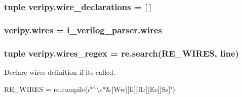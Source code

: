 \hypertarget{namespaceveripy_a1bf7781cecfa001f9a1c00ad44cb8f59}{
\subsubsection[{wire\-\_\-declarations}]{\setlength{\rightskip}{0pt plus 5cm}tuple veripy.\-wire\-\_\-declarations = \mbox{[}$\,$\mbox{]}}}\label{namespaceveripy_a1bf7781cecfa001f9a1c00ad44cb8f59}
\hypertarget{namespaceveripy_a830a9b7ff5ad16c99be1ec8926435b58}{
\subsubsection[{wires}]{\setlength{\rightskip}{0pt plus 5cm}veripy.\-wires = i\-\_\-verilog\-\_\-parser.\-wires}}\label{namespaceveripy_a830a9b7ff5ad16c99be1ec8926435b58}
\hypertarget{namespaceveripy_a7f5cee93cf9ba15ed101dff1c5c85a2b}{
\subsubsection[{wires\-\_\-regex}]{\setlength{\rightskip}{0pt plus 5cm}tuple veripy.\-wires\-\_\-regex = re.\-search(R\-E\-\_\-\-W\-I\-R\-E\-S, {\bf line})}}\label{namespaceveripy_a7f5cee93cf9ba15ed101dff1c5c85a2b}


Declare wires definition if its called. 

R\-E\-\_\-\-W\-I\-R\-E\-S = re.\-compile(r\char`\"{}$^\wedge$\textbackslash{}s$\ast$\&\mbox{[}\-Ww\mbox{]}\mbox{[}\-Ii\mbox{]}\mbox{[}\-Rr\mbox{]}\mbox{[}\-Ee\mbox{]}\mbox{[}\-Ss\mbox{]}\char`\"{}) 